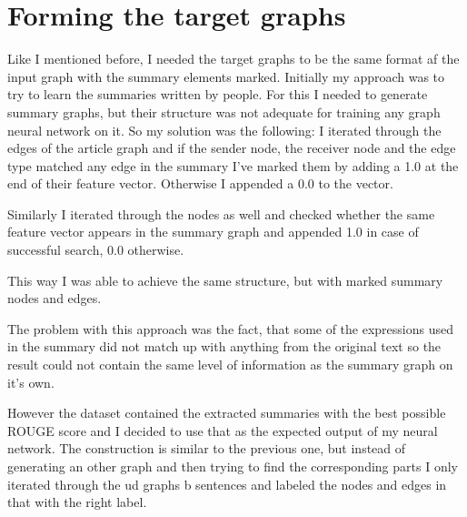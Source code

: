 \section{Forming the target graphs}
Like I mentioned before, I needed the target graphs to be the same format af the input graph with the summary elements marked. Initially my approach was to try to learn the summaries written by people. For this I needed to generate summary graphs, but their structure was not adequate for training any graph neural network on it. So my solution was the following: I iterated through the edges of the article graph and if the sender node, the receiver node and the edge type matched any edge in the summary I've marked them by adding a 1.0 at the end of their feature vector. Otherwise I appended a 0.0 to the vector.

Similarly I iterated through the nodes as well and checked whether the same feature vector appears in the summary graph and appended 1.0 in case of successful search, 0.0 otherwise.

This way I was able to achieve the same structure, but with marked summary nodes and edges.

The problem with this approach was the fact, that some of the expressions used in the summary did not match up with anything from the original text so the result could not contain the same level of information as the summary graph on it's own.

However the dataset contained the extracted summaries with the best possible ROUGE score and I decided to use that as the expected output of my neural network. The construction is similar to the previous one, but instead of generating an other graph and then trying to find the corresponding parts I only iterated through the ud graphs b sentences and labeled the nodes and edges in that with the right label.

